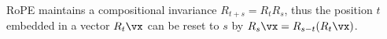 RoPE maintains a compositional invariance $R_{t+s}  = R_tR_s$,
thus the position $t$ embedded in a vector $R_t\vx$ can be reset to $s$ by $R_s\vx = R_{s-t}(R_t\vx)$.
